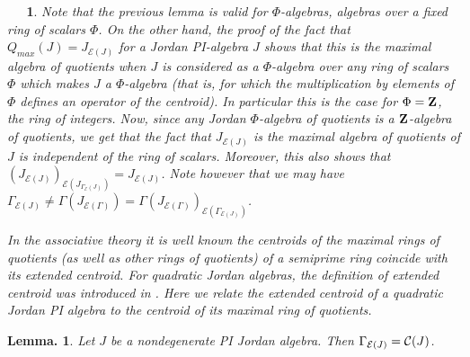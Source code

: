 \documentclass[a4paper,twoside,11pt]{article}
\theoremstyle{plain}
\theoremstyle{miestilo}
\newtheorem{lema}[subsection]{Lemma.}
\theoremstyle{misnotas}
\newtheorem{apartado}[subsection]{\ {\ }}
\begin{document}
\begin{apartado}Note that the previous lemma is valid for $\Phi$-algebras, algebras over a fixed ring of
scalars $\Phi$. On the other hand, the proof of the fact that $Q_{max}(J) = J_{{\mathcal E}(J)}$ for a
Jordan PI-algebra $J$ shows that this is the maximal algebra of quotients when $J$ is
considered as a $\Phi$-algebra over any ring of scalars $\Phi$  which makes $J$ a $\Phi$-algebra (that is, for which the multiplication by elements of $\Phi$ defines an operator of the centroid). In particular this is the
case for $\Phi = {\bf Z}$, the ring of integers. Now, since any Jordan $\Phi$-algebra of
quotients is a ${\bf Z}$-algebra of quotients, we get that the fact that $J_{\mathcal E(J)}$ is the
maximal algebra of quotients of $J$ is independent of the ring of scalars. Moreover, this
also shows that $(J_{\mathcal E(J)})_{{\mathcal E}(J_{\Gamma_{\mathcal E}(J)})}= J_{\mathcal E(J)}$. Note however that we may have $\Gamma_{{\mathcal E}(J)}
\ne \Gamma(J_{{\mathcal E}(\Gamma)}) = \Gamma(J_{{\mathcal E}(\Gamma)})_{{\mathcal E}(\Gamma_{{\mathcal E}(J)})}$.

In the associative theory it is well known the centroids of the maximal rings of quotients (as well as other rings of quotients) of a semiprime ring coincide with its extended centroid. For quadratic Jordan algebras, the definition of extended centroid was introduced in \cite{pi-ii}. Here we relate the extended centroid of a quadratic Jordan PI algebra to the centroid of its maximal ring of quotients.


\end{apartado}


\begin{lema}Let $J$ be a nondegenerate PI Jordan algebra. Then $\Gamma_{{\mathcal E}(J)}
=\mathcal C(J)$.\end{lema}
\end{document}
